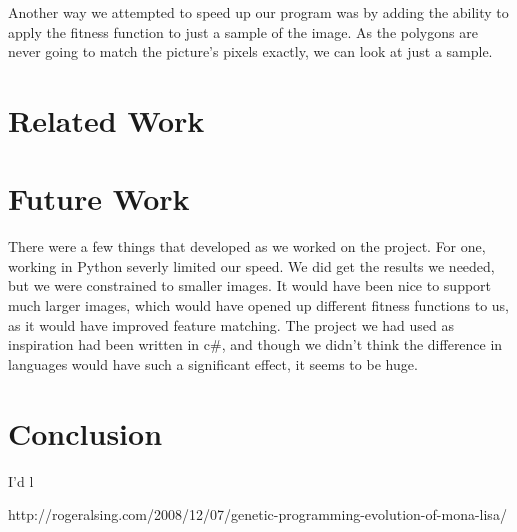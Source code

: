 \documentclass[12pt,letterpaper]{article}
\begin{document}
Another way we attempted to speed up our program was by adding the ability to apply the fitness function to just a sample of the image.  As the polygons are never going to match the picture's pixels exactly, we can look at just a sample.

\section{Related Work}

\section{Future Work}
There were a few things that developed as we worked on the project. For one, working in Python severly limited our speed. We did get the results we needed, but we were constrained to smaller images. It would have been nice to support much larger images, which would have opened up different fitness functions to us, as it would have improved feature matching. The project we had used as inspiration had been written in c\#, and though we didn't think the difference in languages would have such a significant effect, it seems to be huge.

\section{Conclusion}

I'd l


http://rogeralsing.com/2008/12/07/genetic-programming-evolution-of-mona-lisa/
\end{document}
